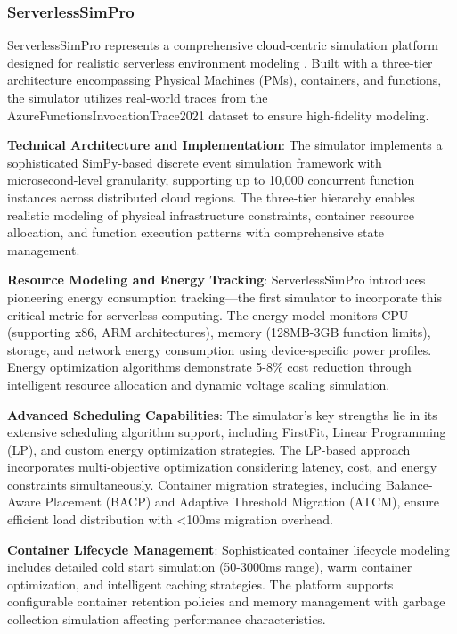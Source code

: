 \subsubsection{ServerlessSimPro}

ServerlessSimPro represents a comprehensive cloud-centric simulation platform designed for realistic serverless environment modeling \cite{das2022serverlesssimpro}. Built with a three-tier architecture encompassing Physical Machines (PMs), containers, and functions, the simulator utilizes real-world traces from the AzureFunctionsInvocationTrace2021 dataset to ensure high-fidelity modeling.

\textbf{Technical Architecture and Implementation}: The simulator implements a sophisticated SimPy-based discrete event simulation framework with microsecond-level granularity, supporting up to 10,000 concurrent function instances across distributed cloud regions. The three-tier hierarchy enables realistic modeling of physical infrastructure constraints, container resource allocation, and function execution patterns with comprehensive state management.

\textbf{Resource Modeling and Energy Tracking}: ServerlessSimPro introduces pioneering energy consumption tracking—the first simulator to incorporate this critical metric for serverless computing. The energy model monitors CPU (supporting x86, ARM architectures), memory (128MB-3GB function limits), storage, and network energy consumption using device-specific power profiles. Energy optimization algorithms demonstrate 5-8\% cost reduction through intelligent resource allocation and dynamic voltage scaling simulation.

\textbf{Advanced Scheduling Capabilities}: The simulator's key strengths lie in its extensive scheduling algorithm support, including FirstFit, Linear Programming (LP), and custom energy optimization strategies. The LP-based approach incorporates multi-objective optimization considering latency, cost, and energy constraints simultaneously. Container migration strategies, including Balance-Aware Placement (BACP) and Adaptive Threshold Migration (ATCM), ensure efficient load distribution with <100ms migration overhead.

\textbf{Container Lifecycle Management}: Sophisticated container lifecycle modeling includes detailed cold start simulation (50-3000ms range), warm container optimization, and intelligent caching strategies. The platform supports configurable container retention policies and memory management with garbage collection simulation affecting performance characteristics.

